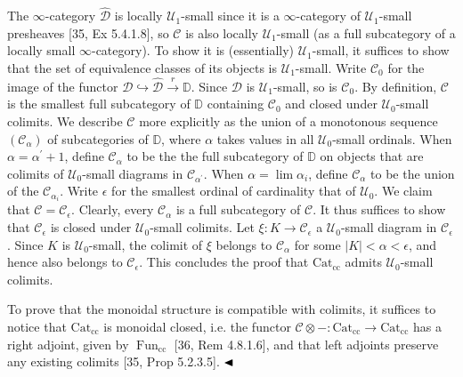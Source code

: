 The $\infty$-category $\widehat{{\mathcal{D}}}$ is locally ${\mathcal{U}}_{1}$-small since it is a $\infty$-category of ${\mathcal{U}}_{1}$-small presheaves [35, Ex 5.4.1.8], so ${\mathcal{C}}$ is also locally ${\mathcal{U}}_{1}$-small (as a full subcategory of a locally small $\infty$-category). To show it is (essentially) ${\mathcal{U}}_{1}$-small, it suffices to show that the set of equivalence classes of its objects is ${\mathcal{U}}_{1}$-small. Write ${\mathcal{C}}_{0}$ for the image of the functor ${\mathcal{D}}\hookrightarrow\widehat{\mathcal{D}}\xrightarrow{r}\mathbb{D}$. Since ${\mathcal{D}}$ is ${\mathcal{U}}_{1}$-small, so is ${\mathcal{C}}_{0}$. By definition, ${\mathcal{C}}$ is the smallest full subcategory of $\mathbb{D}$ containing ${\mathcal{C}}_{0}$ and closed under ${\mathcal{U}}_{0}$-small colimits. We describe ${\mathcal{C}}$ more explicitly as the union of a monotonous sequence $({\mathcal{C}}_{\alpha})$ of subcategories of $\mathbb{D}$, where $\alpha$ takes values in all ${\mathcal{U}}_{0}$-small ordinals. When $\alpha=\alpha^{\prime}+1$, define ${\mathcal{C}}_{\alpha}$ to be the the full subcategory of $\mathbb{D}$ on objects that are colimits of ${\mathcal{U}}_{0}$-small diagrams in ${\mathcal{C}}_{\alpha^{\prime}}$. When $\alpha=\lim\alpha_{i}$, define ${\mathcal{C}}_{\alpha}$ to be the union of the ${\mathcal{C}}_{\alpha_{i}}$. Write $\epsilon$ for the smallest ordinal of cardinality that of ${\mathcal{U}}_{0}$. We claim that ${\mathcal{C}}={\mathcal{C}}_{\epsilon}$. Clearly, every ${\mathcal{C}}_{\alpha}$ is a full subcategory of ${\mathcal{C}}$. It thus suffices to show that ${\mathcal{C}}_{\epsilon}$ is closed under ${\mathcal{U}}_{0}$-small colimits. Let $\xi:K\to{\mathcal{C}}_{\epsilon}$ a ${\mathcal{U}}_{0}$-small diagram in ${\mathcal{C}}_{\epsilon}$. Since $K$ is ${\mathcal{U}}_{0}$-small, the colimit of $\xi$ belongs to ${\mathcal{C}}_{\alpha}$ for some $|K|<\alpha<\epsilon$, and hence also belongs to ${\mathcal{C}}_{\epsilon}$. This concludes the proof that $\operatorname{Cat_{cc}}$ admits ${\mathcal{U}}_{0}$-small colimits.\par
 
 
 
To prove that the monoidal structure is compatible with colimits, it suffices to notice that $\operatorname{Cat_{cc}}$ is monoidal closed, i.e. the functor ${\mathcal{C}}\otimes-:\operatorname{Cat_{cc}}\to\operatorname{Cat_{cc}}$ has a right adjoint, given by $\operatorname{Fun}_{\text{cc}}$ [36, Rem 4.8.1.6], and that left adjoints preserve any existing colimits [35, Prop 5.2.3.5]. $\hfill\blacktriangleleft$\par
 
 
 
 
